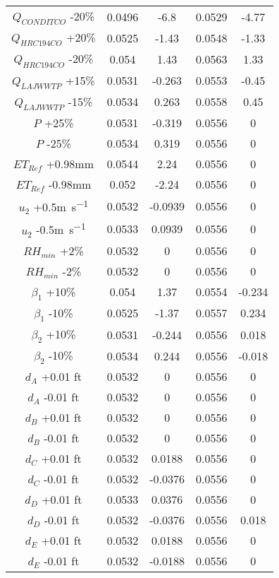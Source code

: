 \begin{linenumbers}
\begin{spacing}{1.0}
\begin{center}
\begin{longtable}{ccccc}
			$Q_{CONDITCO} $ -20\% & 0.0496 & -6.8 & 0.0529 & -4.77 \\
			$Q_{HRC194CO} $ +20\% & 0.0525 & -1.43 & 0.0548 & -1.33 \\
			$Q_{HRC194CO} $ -20\% & 0.054 & 1.43 & 0.0563 & 1.33 \\
			$Q_{LAJWWTP} $ +15\% & 0.0531 & -0.263 & 0.0553 & -0.45 \\
			$Q_{LAJWWTP} $ -15\% & 0.0534 & 0.263 & 0.0558 & 0.45 \\
			$P$ +25\% & 0.0531 & -0.319 & 0.0556 & 0 \\
			$P$ -25\% & 0.0534 & 0.319 & 0.0556 & 0 \\
			$ET_{Ref}$ +0.98\si{\milli\meter} & 0.0544 & 2.24 & 0.0556 & 0 \\
			$ET_{Ref}$ -0.98\si{\milli\meter} & 0.052 & -2.24 & 0.0556 & 0 \\
			$u_{2} $ +0.5\si{\meter\per\second} & 0.0532 & -0.0939 & 0.0556 & 0 \\
			$u_{2} $ -0.5\si{\meter\per\second} & 0.0533 & 0.0939 & 0.0556 & 0 \\
			$RH_{min} $ +2\% & 0.0532 & 0 & 0.0556 & 0 \\
			$RH_{min} $ -2\% & 0.0532 & 0 & 0.0556 & 0 \\
			$\beta_{1} $ +10\% & 0.054 & 1.37 & 0.0554 & -0.234 \\
			$\beta_{1} $ -10\% & 0.0525 & -1.37 & 0.0557 & 0.234 \\
			$\beta_{2} $ +10\% & 0.0531 & -0.244 & 0.0556 & 0.018 \\
			$\beta_{2} $ -10\% & 0.0534 & 0.244 & 0.0556 & -0.018 \\
			$d_{A} $ +0.01 ft & 0.0532 & 0 & 0.0556 & 0 \\
			$d_{A} $ -0.01 ft & 0.0532 & 0 & 0.0556 & 0 \\
			$d_{B} $ +0.01 ft & 0.0532 & 0 & 0.0556 & 0 \\
			$d_{B} $ -0.01 ft & 0.0532 & 0 & 0.0556 & 0 \\
			$d_{C} $ +0.01 ft & 0.0532 & 0.0188 & 0.0556 & 0 \\
			$d_{C} $ -0.01 ft & 0.0532 & -0.0376 & 0.0556 & 0 \\
			$d_{D} $ +0.01 ft & 0.0533 & 0.0376 & 0.0556 & 0 \\
			$d_{D} $ -0.01 ft & 0.0532 & -0.0376 & 0.0556 & 0.018 \\
			$d_{E} $ +0.01 ft & 0.0532 & 0.0188 & 0.0556 & 0 \\
			$d_{E} $ -0.01 ft & 0.0532 & -0.0188 & 0.0556 & 0 \\

\end{longtable}
\end{center}
\end{spacing}
\end{linenumbers}
